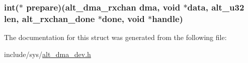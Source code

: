 \hypertarget{structalt__dma__rxchan__dev__s_af9a5563e6c9cf1e1d2f37c0db9fe4130}{
\subsubsection[{prepare}]{\setlength{\rightskip}{0pt plus 5cm}int($\ast$ {\bf prepare})({\bf alt\-\_\-dma\-\_\-rxchan} dma, void $\ast$data, {\bf alt\-\_\-u32} len, {\bf alt\-\_\-rxchan\-\_\-done} $\ast$done, void $\ast$handle)}}\label{structalt__dma__rxchan__dev__s_af9a5563e6c9cf1e1d2f37c0db9fe4130}


\-The documentation for this struct was generated from the following file\-:\begin{DoxyCompactItemize}
\item 
include/sys/\hyperlink{alt__dma__dev_8h}{alt\-\_\-dma\-\_\-dev.\-h}\end{DoxyCompactItemize}
